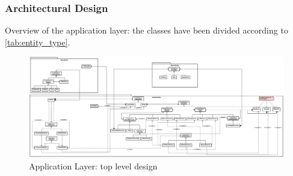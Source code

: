\subsubsection{Architectural Design}
Overview of the application layer: the classes have been divided according to 
\ref{tab:entity_type}.
\begin{figure}[H]
  \centering
  \includegraphics[width=.95\columnwidth]{sections/images/solution/app_architecture.eps}
  \caption{Application Layer: top level design}
  \label{fig:sd-app-architecture}
\end{figure}


